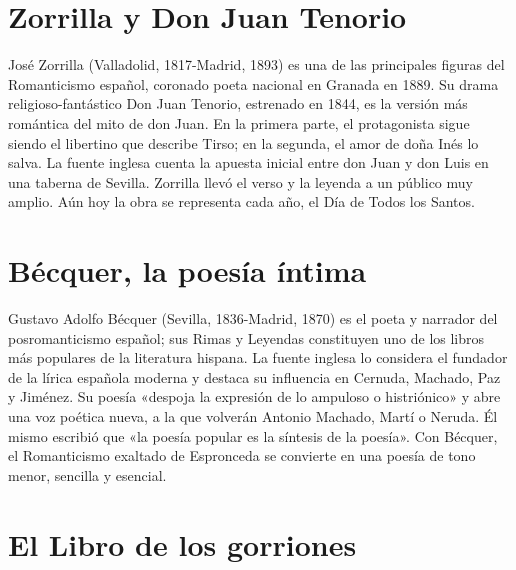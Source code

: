 \documentclass{book}
\begin{document}

\section{Zorrilla y Don Juan Tenorio}

José Zorrilla (Valladolid, 1817-Madrid, 1893) es una de las principales figuras del Romanticismo español, coronado poeta nacional en Granada en 1889. Su drama religioso-fantástico Don Juan Tenorio, estrenado en 1844, es la versión más romántica del mito de don Juan. En la primera parte, el protagonista sigue siendo el libertino que describe Tirso; en la segunda, el amor de doña Inés lo salva. La fuente inglesa cuenta la apuesta inicial entre don Juan y don Luis en una taberna de Sevilla. Zorrilla llevó el verso y la leyenda a un público muy amplio. Aún hoy la obra se representa cada año, el Día de Todos los Santos.


\section{Bécquer, la poesía íntima}

Gustavo Adolfo Bécquer (Sevilla, 1836-Madrid, 1870) es el poeta y narrador del posromanticismo español; sus Rimas y Leyendas constituyen uno de los libros más populares de la literatura hispana. La fuente inglesa lo considera el fundador de la lírica española moderna y destaca su influencia en Cernuda, Machado, Paz y Jiménez. Su poesía «despoja la expresión de lo ampuloso o histriónico» y abre una voz poética nueva, a la que volverán Antonio Machado, Martí o Neruda. Él mismo escribió que «la poesía popular es la síntesis de la poesía». Con Bécquer, el Romanticismo exaltado de Espronceda se convierte en una poesía de tono menor, sencilla y esencial.


\section{El Libro de los gorriones}
\end{document}
